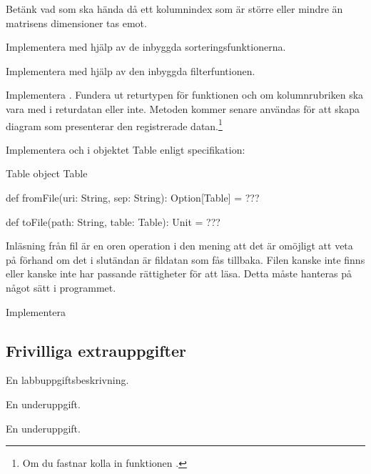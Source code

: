Betänk vad som ska hända då ett kolumnindex som är större eller mindre än matrisens dimensioner tas emot. \TODO

\Subtask Implementera  med hjälp av de inbyggda sorteringsfunktionerna.

\Subtask Implementera  med hjälp av den inbyggda filterfuntionen.

\Subtask Implementera . Fundera ut returtypen för funktionen och om kolumnrubriken ska vara med i returdatan eller inte. Metoden kommer senare användas för att skapa diagram som presenterar den registrerade datan.\footnote{Om du fastnar kolla in funktionen .}

\Task Implementera  och  i objektet Table enligt specifikation:
\begin{ScalaSpec}{Table}
object Table {

  def fromFile(uri: String, sep: String): Option[Table] = ???

  def toFile(path: String, table: Table): Unit = ???
}
\end{ScalaSpec}

Inläsning från fil är en oren operation i den mening att det är omöjligt att veta på förhand om det i slutändan är fildatan som fås tillbaka. Filen kanske inte finns eller kanske inte har passande rättigheter för att läsa.
Detta måste hanteras på något sätt i programmet.

\Subtask Implementera 
\subsection{Frivilliga extrauppgifter}
    
\Task En labbuppgiftsbeskrivning.

\Subtask En underuppgift.

\Subtask En underuppgift.